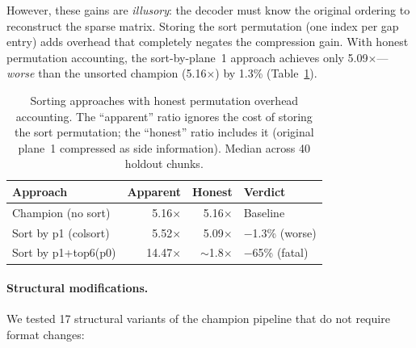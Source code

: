 \documentclass[10pt,twocolumn,letterpaper]{article}
\begin{document}
However, these gains are \emph{illusory}: the decoder must know the original ordering to reconstruct the sparse matrix.
Storing the sort permutation (one index per gap entry) adds overhead that completely negates the compression gain.
With honest permutation accounting, the sort-by-plane~1 approach achieves only 5.09$\times$---\emph{worse} than the unsorted champion (5.16$\times$) by 1.3\% (Table~\ref{tab:sorting_honest}).

\begin{table}[h]
\centering
\caption{Sorting approaches with honest permutation overhead accounting. The ``apparent'' ratio ignores the cost of storing the sort permutation; the ``honest'' ratio includes it (original plane~1 compressed as side information). Median across 40 holdout chunks.}
\label{tab:sorting_honest}
\footnotesize
\begin{tabular}{lrrl}
\toprule
Approach & Apparent & Honest & Verdict \\
\midrule
Champion (no sort) & 5.16$\times$ & 5.16$\times$ & Baseline \\
Sort by p1 (colsort) & 5.52$\times$ & 5.09$\times$ & $-$1.3\% (worse) \\
Sort by p1+top6(p0) & 14.47$\times$ & $\sim$1.8$\times$ & $-$65\% (fatal) \\
\bottomrule
\end{tabular}
\end{table}

\paragraph{Structural modifications.}
We tested 17 structural variants of the champion pipeline that do not require format changes:
\end{document}

